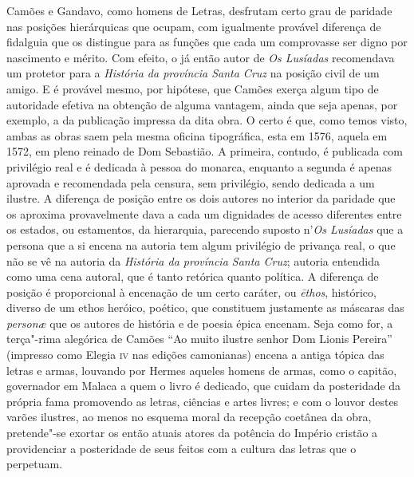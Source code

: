 Camões e Gandavo, como homens de Letras, desfrutam certo grau de
paridade nas posições hierárquicas que ocupam, com igualmente provável
diferença de fidalguia que os distingue para as funções que cada um
comprovasse ser digno por nascimento e mérito. Com efeito, o já então
autor de \textit{Os Lusíadas} recomendava um protetor para a \textit{História da
província Santa Cruz} na posição civil de um amigo. E é provável mesmo,
por hipótese, que Camões exerça algum tipo de autoridade efetiva na
obtenção de alguma vantagem, ainda que seja apenas, por exemplo, a da
publicação impressa da dita obra. O certo é que, como temos visto,
ambas as obras saem pela mesma oficina tipográfica, esta em 1576,
aquela em 1572, em pleno reinado de Dom Sebastião. A primeira, contudo,
é publicada com privilégio real e é dedicada à pessoa do monarca,
enquanto a segunda é apenas aprovada e recomendada pela censura, sem
privilégio, sendo dedicada a um ilustre. A diferença de posição entre
os dois autores no interior da paridade que os aproxima provavelmente
dava a cada um dignidades de acesso diferentes entre os estados, ou
estamentos, da hierarquia, parecendo suposto n'\textit{Os Lusíadas} 
que a persona que a si encena na autoria tem algum privilégio
de privança real, o que não se vê na autoria da \textit{História da província
Santa Cruz}; autoria entendida como uma cena autoral, que é tanto
retórica quanto política. A diferença de posição é proporcional à
encenação de um certo caráter, ou \textit{\=ethos}, histórico, diverso de um 
ethos heróico, poético, que constituem justamente as máscaras das
\textit{person\ae} que os autores de história e de poesia épica encenam. Seja
como for, a terça"-rima alegórica de Camões ``Ao muito
ilustre senhor Dom Lionis Pereira'' (impresso como Elegia
\textsc{iv} nas edições camonianas) encena a antiga tópica das letras e armas,
louvando por Hermes aqueles homens de armas, como o capitão, governador
em Malaca a quem o livro é dedicado, que cuidam da posteridade da
própria fama promovendo as letras, ciências e artes livres; e com o
louvor destes varões ilustres, ao menos no esquema moral da recepção
coetânea da obra, pretende"-se exortar os então atuais atores da
potência do Império cristão a providenciar a posteridade de seus feitos
com a cultura das letras que o perpetuam.

